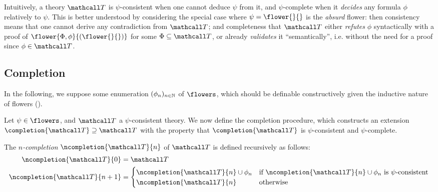 Intuitively, a theory $\tT$ is $\psi$-consistent when one cannot deduce $\psi$
from it, and $\psi$-complete when it \emph{decides} any formula $\phi$
relatively to $\psi$. This is better understood by considering the special case
where $\psi = \flower{{}}{{}}$ is the \emph{absurd} flower: then consistency
means that one cannot derive any contradiction from $\tT$; and completeness that
$\tT$ either \emph{refutes} $\phi$ syntactically with a proof of $\flower{\Phi,
\phi}{(\flower{}{})}$ for some $\Phi \subseteq \tT$, or already \emph{validates}
it ``semantically'', i.e. without the need for a proof since $\phi \in \tT$.


\subsection{Completion}

In the following, we suppose some enumeration $(\phi_n)_{n \in \mathbb{N}}$ of
$\flowers$, which should be definable constructively given the
inductive nature of flowers ().

Let $\psi \in \flowers$, and $\tT$ a $\psi$-consistent theory. We now define the
completion procedure, which constructs an extension $\completion{\tT} \supseteq
\tT$ with the property that $\completion{\tT}$ is $\psi$-consistent and
$\psi$-complete.

\begin{definition}[$n$-completion]
  The \emph{$n$-completion} $\ncompletion{\tT}{n}$ of $\tT$ is defined recursively
  as follows:
  \begin{align*}
    \ncompletion{\tT}{0} &= \tT \\
    \ncompletion{\tT}{n+1} &=
    \begin{cases}
      \ncompletion{\tT}{n} \cup \phi_n &\text{if $\ncompletion{\tT}{n} \cup \phi_n$ is $\psi$-consistent} \\
      \ncompletion{\tT}{n} &\text{otherwise}
    \end{cases}
  \end{align*}
\end{definition}

